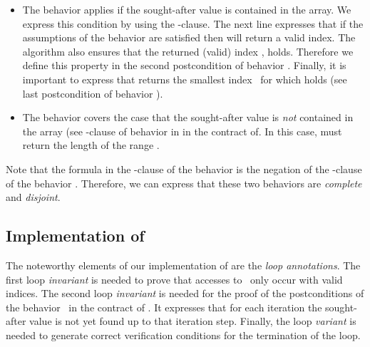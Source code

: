 \begin{itemize}
\item
The behavior  applies if the sought-after value is contained in the array.
We express this condition by using the -clause.
The next line expresses that if the assumptions of the behavior are satisfied then
\find will return a valid index.
The algorithm also ensures that  the returned (valid) index ,
 holds.
Therefore we define this property in the second postcondition of behavior .
Finally, it is important to express that \find returns the smallest index~
for which  holds (see last postcondition of behavior ).

\item
The behavior  covers the case that the sought-after value 
is \emph{not} contained in the array (see -clause of behavior  in
in the contract of.
In this case, \find must return the length  of the range .
\end{itemize}

Note that the formula in the -clause of the behavior 
is the negation of the -clause of the behavior .
Therefore, we can express  that these two behaviors are
\emph{complete} and \emph{disjoint}.

\subsection{Implementation of \find}

The noteworthy elements of our implementation of  are the 
\emph{loop annotations}.
%
The first loop \emph{invariant} is needed to prove that accesses
to~ only occur with valid indices. The second  loop \emph{invariant} is needed
for the proof of the postconditions of the
behavior~ in the contract of .
It expresses that for each iteration the sought-after value is not
yet found up to that iteration step.
Finally, the  loop \emph{variant}  is needed to generate correct verification
conditions for the termination of the loop.



\clearpage

